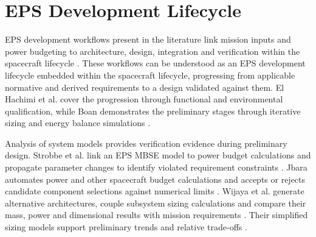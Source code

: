 \section{EPS Development Lifecycle}
EPS development workflows present in the literature link mission inputs and power budgeting to architecture, design, integration and verification within the spacecraft lifecycle \citep{handpicked-0003,review-0289}.
These workflows can be understood as an EPS development lifecycle embedded within the spacecraft lifecycle, progressing from applicable normative and derived requirements to a design validated against them.
El Hachimi et al. cover the progression through functional and environmental qualification, while Boan demonstrates the preliminary stages through iterative sizing and energy balance simulations \citep[Secs.~2--5]{handpicked-0003}\citep[Secs.~2--4]{review-0289}.

Analysis of system models provides verification evidence during preliminary design.
Strobbe et al. link an EPS MBSE model to power budget calculations and propagate parameter changes to identify violated requirement constraints \citep[Secs.~III--IV]{review-0764}.
Jbara automates power and other spacecraft budget calculations and accepts or rejects candidate component selections against numerical limits \citep[Secs.~4--5]{review-0270}.
Wijaya et al. generate alternative architectures, couple subsystem sizing calculations and compare their mass, power and dimensional results with mission requirements \citep[Sec.~5.2]{review-0055}.
Their simplified sizing models support preliminary trends and relative trade-offs \citep[Sec.~6.1]{review-0055}.
